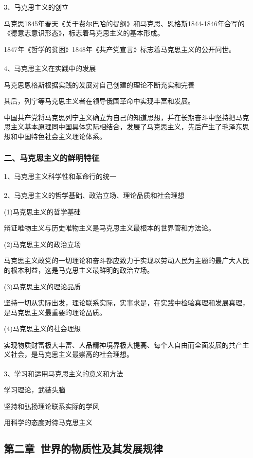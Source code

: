 \documentclass{ctexart}
\begin{document}
3、马克思主义的创立

马克思1845年春天《关于费尔巴哈的提纲》和马克思、恩格斯1844-1846年合写的《德意志意识形态》，标志着马克思主义的基本形成。

1847年《哲学的贫困》1848年《共产党宣言》标志着马克思主义的公开问世。
\\\\

4、马克思主义在实践中的发展

马克思恩格斯根据实践的发展对自己创建的理论不断充实和完善

其后，列宁等马克思主义者在领导俄国革命中实现丰富和发展。

中国共产党将马克思列宁主义确立为自己的知道思想，并在长期奋斗中坚持把马克思主义基本原理同中国具体实际相结合，发展了马克思主义，先后产生了毛泽东思想和中国特色社会主义理论体系。

\subsubsection{二、马克思主义的鲜明特征}
1、马克思主义科学性和革命行的统一
\\\\

2、马克思主义的哲学基础、政治立场、理论品质和社会理想

(1)马克思主义的哲学基础

辩证唯物主义与历史唯物主义是马克思主义最根本的世界管和方法论。

(2)马克思主义的政治立场

马克思主义政党的一切理论和奋斗都应致力于实现以劳动人民为主题的最广大人民的根本利益，这是马克思主义最鲜明的政治立场。

(3)马克思主义的理论品质

坚持一切从实际出发，理论联系实际，实事求是，在实践中检验真理和发展真理，是马克思主义最重要的理论品质。

(4)马克思主义的社会理想

实现物质财富极大丰富、人品精神境界极大提高、每个人自由而全面发展的共产主义社会，是马克思主义最崇高的社会理想。
\\\\
3、学习和运用马克思主义的意义和方法

学习理论，武装头脑

坚持和弘扬理论联系实际的学风

用科学的态度对待马克思主义



\subsection{第二章\ 世界的物质性及其发展规律}
\end{document}
